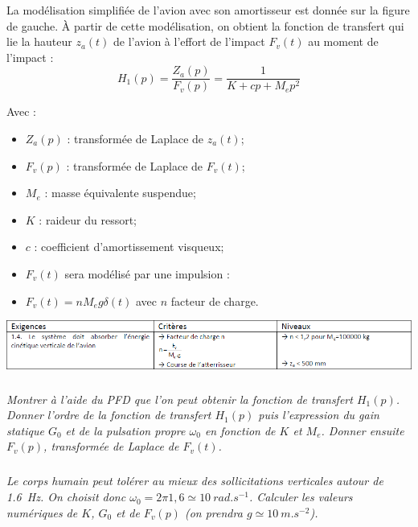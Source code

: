 \documentclass[10pt,fleqn]{article} %
\begin{document}
\begin{multicols}{2}
La modélisation simplifiée de l'avion avec son
amortisseur est donnée sur la figure de gauche. À partir
de cette modélisation, on obtient la fonction de
transfert qui lie la hauteur $z_a(t)$ de l'avion à l’effort de
l’impact $F_v(t)$ au moment de l’impact :
$$
H_1(p)=\dfrac{Z_a(p)}{F_v(p)}=\dfrac{1}{K+cp+M_e p^2}
$$

Avec : 
\begin{itemize}
\item $Z_a(p)$ : transformée de Laplace de $z_a(t)$;
\item $F_v(p)$ : transformée de Laplace de $F_v(t)$;
\item $M_e$ : masse équivalente suspendue;
\item $K$ : raideur du ressort;
\item $c$ : coefficient d’amortissement visqueux;
\item $F_v(t)$ sera modélisé par une impulsion :
\item $F_v(t)=n M_e g \delta (t)$ avec $n$ facteur de charge.
\end{itemize}

\begin{center}
\includegraphics[width=\linewidth]{images/img_03}
\end{center}



\subparagraph{}
\textit{Montrer à l’aide du PFD que l’on peut obtenir la fonction de transfert $H_1(p)$. Donner l’ordre de la fonction
de transfert $H_1(p)$ puis l’expression du gain statique $G_0$ et de la pulsation propre $\omega_0$ en fonction de $K$ et $M_e$.
Donner ensuite $F_v(p)$, transformée de Laplace de $F_v(t)$.}
\ifprof
\begin{corrige}

\end{corrige}
\else
\fi



\subparagraph{}
\textit{Le corps humain peut tolérer au mieux des sollicitations verticales autour de \SI{1,6}{Hz}. On choisit donc $\omega_0 = 2\pi 1,6 \simeq \SI{10}{rad.s^{-1}}$. Calculer les valeurs numériques de $K$, $G_0$ et de $F_v(p)$ (on prendra $g \simeq \SI{10}{m.s^{-2}}$).}
\ifprof
\begin{corrige}
\end{corrige}
\else
\fi



\end{multicols}
\end{document}
